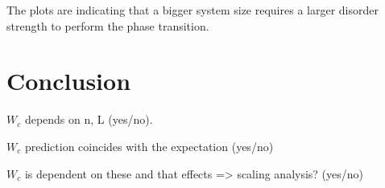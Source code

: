 \documentclass[reprint,amsmath,amssymb,aps,prb]{revtex4-2}
\begin{document}
The plots are indicating that a bigger system size requires a larger disorder strength to perform the phase transition.


\section{Conclusion}

$W_c$ depends on n, L (yes/no).

$W_c$ prediction coincides with the expectation (yes/no)

$W_c$ is dependent on these and that effects => scaling analysis? (yes/no)



\newpage
\appendix
\end{document}
